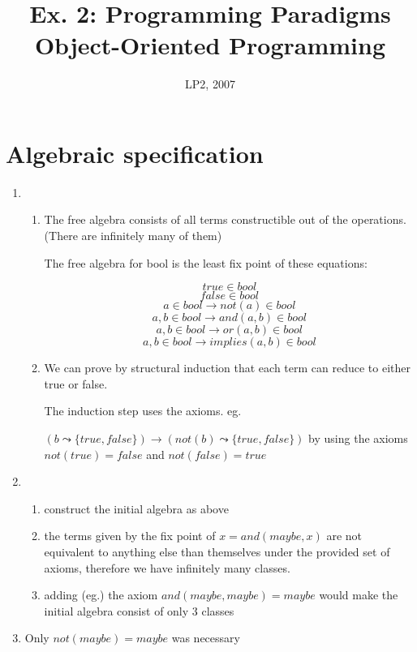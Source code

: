 \documentclass{article}
\begin{document}
\title{Ex. 2: Programming Paradigms 
\\
Object-Oriented Programming}
\date{LP2, 2007}
\author{}
\maketitle

\section*{Algebraic specification}

\begin{enumerate}
\item

\begin{enumerate}

\item The free algebra consists of all terms constructible out of the operations. (There are infinitely many of them)

The free algebra for bool is the least fix point of these equations:

\[true \in bool                          \]
\[false \in bool                         \]
\[a \in bool \rightarrow not (a) \in bool           \]
\[a,b \in bool \rightarrow and (a,b) \in bool     \]
\[a,b \in bool \rightarrow or (a,b) \in bool      \]
\[a,b \in bool \rightarrow implies (a,b) \in bool \]


\item
  We can prove by structural induction that each term can reduce to either true or false.

  The induction step uses the axioms. eg.

  $(b \leadsto \{true, false\}) \rightarrow (not(b) \leadsto \{true,false\})$ by using the axioms $not(true) = false$ and $not(false) = true$
  \end{enumerate}

\item
\begin{enumerate}


\item construct the initial algebra as above
\item the terms given by the fix point of $x = and (maybe, x)$ are not equivalent to anything else than themselves 
   under the provided set of axioms, therefore we have infinitely many classes.
\item adding (eg.) the axiom $and (maybe, maybe) = maybe$ would make the initial algebra consist of only 3 classes
\end{enumerate}

\item
Only $not (maybe) = maybe$ was necessary
\end{enumerate}
\end{document}
